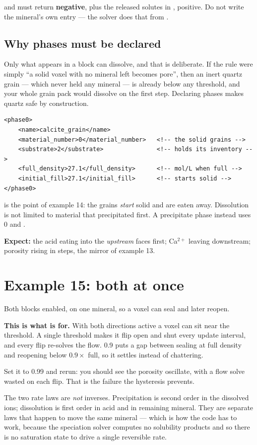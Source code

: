 and must return  \textbf{negative}, plus the released solutes in
, positive. Do not write the mineral's own  entry --- the
solver does that from .

\subsection{Why phases must be declared}

Only what appears in a  block can dissolve, and that is deliberate.
If the rule were simply ``a solid voxel with no mineral left becomes pore'',
then an inert quartz grain --- which never held any mineral --- is already below
any threshold, and your whole grain pack would dissolve on the first step.
Declaring phases makes quartz safe by construction.

\begin{lstlisting}[style=xml]
<phase0>
    <name>calcite_grain</name>
    <material_number>0</material_number>   <!-- the solid grains -->
    <substrate>2</substrate>               <!-- holds its inventory -->
    <full_density>27.1</full_density>      <!-- mol/L when full -->
    <initial_fill>27.1</initial_fill>      <!-- starts solid -->
</phase0>
\end{lstlisting}

 is the point of example 14: the grains \emph{start} solid
and are eaten away. Dissolution is not limited to material that precipitated
first. A precipitate phase instead uses  0 and
 .

\textbf{Expect:} the acid eating into the \emph{upstream} faces first; Ca$^{2+}$
leaving downstream; porosity rising in steps, the mirror of example 13.

\section{Example 15: both at once}

Both blocks enabled, on one mineral, so a voxel can seal and later reopen.

\begin{cbnote}
\textbf{\color{cbTeal}This is what  is for.}\quad
With both directions active a voxel can sit near the threshold. A single
threshold makes it flip open and shut every update interval, and every flip
re-solves the flow.  0.9 puts a gap between sealing at
full density and reopening below $0.9\times$ full, so it settles instead of
chattering.

Set it to 0.99 and rerun: you should see the porosity oscillate, with a flow
solve wasted on each flip. That is the failure the hysteresis prevents.
\end{cbnote}

The two rate laws are \emph{not} inverses. Precipitation is second order in the
dissolved ions; dissolution is first order in acid and in remaining mineral.
They are separate laws that happen to move the same mineral --- which is how the
code has to work, because the speciation solver computes no solubility
products and so there is no saturation state to drive a single reversible rate.
